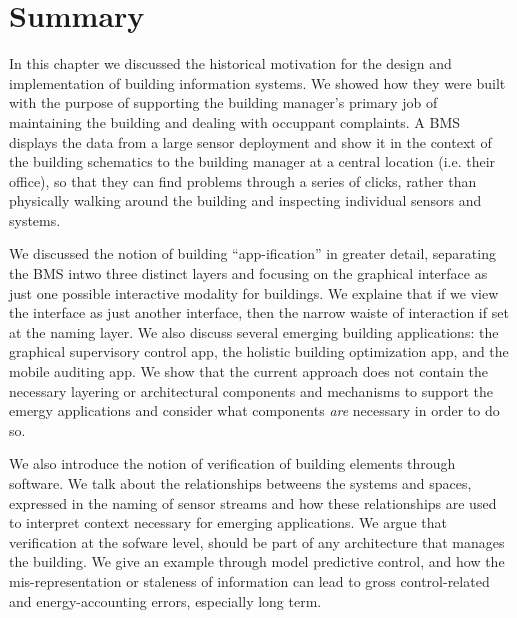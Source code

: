 
\section{Summary}


In this chapter we discussed the historical motivation for the design and implementation of building information systems.
We showed how they were built with the purpose of supporting the building manager's primary job of maintaining the 
building and dealing with occuppant complaints.  A BMS displays the data from a large sensor deployment and show it in the
context of the building schematics to the building manager at a central location (i.e. their office), so that they can 
find problems through a series of clicks, rather than physically walking around the building and inspecting
individual sensors and systems.

We discussed the notion of building ``app-ification'' in greater detail, separating the BMS intwo three distinct layers
and focusing on the graphical interface as just one possible interactive modality for buildings.  We explaine that if we
view the interface as just another interface, then the narrow waiste of interaction if set at the naming layer.  We also discuss
several emerging building applications: the graphical supervisory control app, the holistic building optimization app,
and the mobile auditing app.  We show that the current approach does not contain the necessary layering or architectural components
and mechanisms to support the emergy applications and consider what components \emph{are} necessary in order to do so.

We also introduce the notion of verification of building elements through software.  We talk about the
relationships betweens the systems and spaces, expressed in the naming of sensor streams and how these relationships are used
to interpret context necessary for emerging applications.  We argue that verification at the sofware level, should be part of any
architecture that manages the building.  We give an example through model predictive control, and how the mis-representation or
staleness of information can lead to gross control-related and energy-accounting errors, especially long term.

